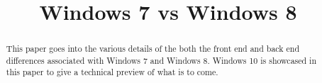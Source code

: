 \documentclass[conference]{IEEEtran}
\begin{document}
\title{Windows 7 vs Windows 8}

\author{
}
%
%
%


\maketitle


\begin{abstract}
This paper goes into the various details of the both the front end and back end differences associated with Windows 7 and Windows 8. Windows 10 is showcased in this paper to give a technical preview of what is to come.
\end{abstract}
\end{document}
